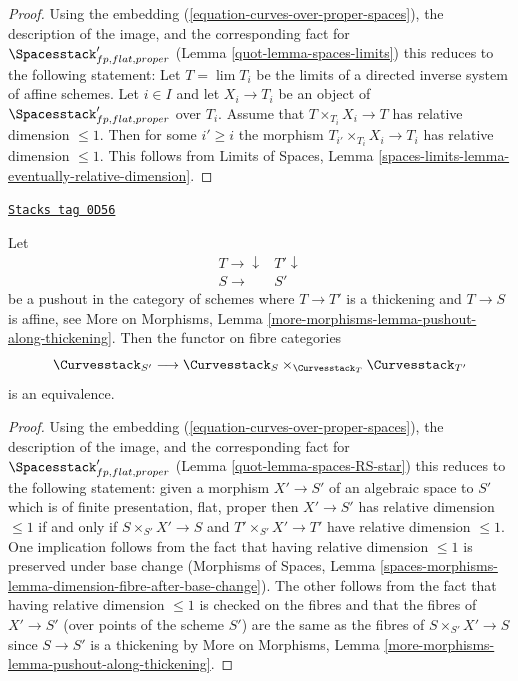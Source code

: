 \begin{proof}

Using the embedding (\ref{equation-curves-over-proper-spaces}),
the description of the image, and
the corresponding fact for $\Spacesstack'_{fp, flat, proper}$
(Lemma \ref{quot-lemma-spaces-limits})
this reduces to the following statement:
Let $T = \lim T_i$ be the limits of a
directed inverse system of affine schemes.
Let $i \in I$ and let $X_i \to T_i$ be an object of
$\Spacesstack'_{fp, flat, proper}$ over $T_i$.
Assume that $T \times_{T_i} X_i \to T$ has
relative dimension $\leq 1$.
Then for some $i' \geq i$ the morphism
$T_{i'} \times_{T_i} X_i \to T_i$ has
relative dimension $\leq 1$. This follows from
Limits of Spaces, Lemma
\ref{spaces-limits-lemma-eventually-relative-dimension}.
\end{proof}

\begin{lemma}
\label{quot-lemma-curves-RS-star}
\href{https://stacks.math.columbia.edu/tag/0D56}{\texttt{Stacks tag 0D56}}

Let
$$
\begin{array}{cc}T \longrightarrow\downarrow & T' \downarrow \\ S \longrightarrow & S'\end{array}
$$
be a pushout in the category of schemes where
$T \to T'$ is a thickening and $T \to S$ is affine, see
More on Morphisms, Lemma \ref{more-morphisms-lemma-pushout-along-thickening}.
Then the functor on fibre categories
$$
\Curvesstack_{S'}
\longrightarrow
\Curvesstack_S
\times_{\Curvesstack_T}
\Curvesstack_{T'}
$$
is an equivalence.
\end{lemma}

\begin{proof}

Using the embedding (\ref{equation-curves-over-proper-spaces}),
the description of the image, and
the corresponding fact for $\Spacesstack'_{fp, flat, proper}$
(Lemma \ref{quot-lemma-spaces-RS-star})
this reduces to the following statement:
given a morphism $X' \to S'$ of an algebraic space to $S'$
which is of finite presentation, flat, proper then
$X' \to S'$ has relative dimension $\leq 1$
if and only if $S \times_{S'} X' \to S$
and $T' \times_{S'} X' \to T'$ have relative dimension $\leq 1$.
One implication follows from the fact that
having relative dimension $\leq 1$ is preserved under base change
(Morphisms of Spaces, Lemma
\ref{spaces-morphisms-lemma-dimension-fibre-after-base-change}).
The other follows from the fact that having relative
dimension $\leq 1$ is checked on the fibres and that
the fibres of $X' \to S'$ (over points of the scheme $S'$)
are the same as the fibres of $S \times_{S'} X' \to S$
since $S \to S'$ is a thickening by
More on Morphisms, Lemma \ref{more-morphisms-lemma-pushout-along-thickening}.
\end{proof}

